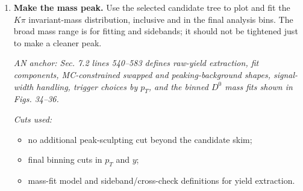 \documentclass[10pt]{article}
\newcommand{\ananchor}[1]{\par{\footnotesize\emph{AN anchor: #1}}\par}
\begin{document}
\begin{enumerate}
\emph{Cuts used:}
\begin{itemize}
\item fit-range cut: \(1.70 < \texttt{Dmass} < 2.05~\mathrm{GeV}\);
\item \(D^0\) fiducial cuts:
\[
2 < \texttt{Dpt} \le 12~\mathrm{GeV},
\qquad |\texttt{Dy}| \le 2;
\]
\item daughter-track momentum cuts:
\[
\texttt{Dtrk1Pt} > 1~\mathrm{GeV},
\qquad \texttt{Dtrk2Pt} > 1~\mathrm{GeV};
\]
\item daughter-track acceptance cuts:
\[
|\texttt{Dtrk1Eta}| < 2.4,
\qquad |\texttt{Dtrk2Eta}| < 2.4;
\]
\item daughter-track relative momentum-error cuts:
\[
\texttt{Dtrk1PtErr}/\texttt{Dtrk1Pt} < 0.1,
\qquad
\texttt{Dtrk2PtErr}/\texttt{Dtrk2Pt} < 0.1;
\]
\item daughter-track high-purity boolean filters:
\texttt{Dtrk1highPurity == true} and \texttt{Dtrk2highPurity == true}, where
available in the from-forest branch set;
\item derived topology sideband cut used for optimization only:
\[
T_{\mathrm{sb}}^{\mathrm{in}}
< |\texttt{Dmass} - m_{D^0}|
< T_{\mathrm{sb}}^{\mathrm{out}};
\]
\item derived topological cuts:
These are the same four topological selections listed in AN Sec. 7
lines 487--493 and Table 7. The branch-to-AN mapping is:
\(\texttt{Dalpha}\) is the pointing angle \(\alpha\) between the reconstructed
\(D^0\) momentum and the primary-to-secondary vertex direction;
\(\texttt{DsvpvSig}\) is the normalized 3D decay length \(d_0/\sigma(d_0)\);
\(\texttt{Dchi2cl}\) is the secondary-vertex probability/confidence level
(not a raw \(\chi^2\)); and \(\texttt{Ddtheta}\) is the daughter-track opening
angle \(\Delta\theta\).
\[
\texttt{Dalpha} < T_{\alpha}(p_T,|y|), \qquad
\texttt{DsvpvSig} > T_{\mathrm{svpv}}(p_T,|y|),
\]
\[
\texttt{Dchi2cl} > T_{\mathrm{vtxProb}}(p_T,|y|), \qquad
\texttt{Ddtheta} < T_{\Delta\theta}(p_T,|y|).
\]
\end{itemize}

\item \textbf{Make the mass peak.}
Use the selected candidate tree to plot and fit the \(K\pi\) invariant-mass
distribution, inclusive and in the final analysis bins. The broad mass range is
for fitting and sidebands; it should not be tightened just to make a cleaner
peak.
\ananchor{Sec. 7.2 lines 540--583 defines raw-yield extraction, fit
components, MC-constrained swapped and peaking-background shapes, signal-width
handling, trigger choices by \(p_T\), and the binned \(D^0\) mass fits shown in
Figs. 34--36.}

\emph{Cuts used:}
\begin{itemize}
\item no additional peak-sculpting cut beyond the candidate skim;
\item final binning cuts in \(p_T\) and \(y\);
\item mass-fit model and sideband/cross-check definitions for yield extraction.
\end{itemize}
\end{enumerate}
\end{document}
